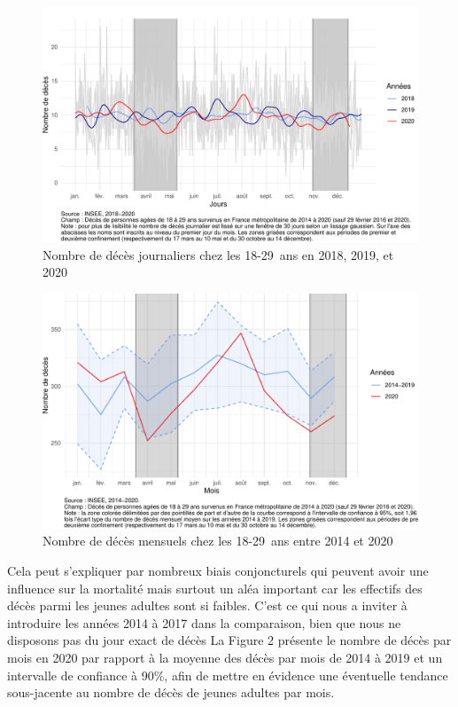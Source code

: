 \documentclass[titlepage]{article}
\begin{document}
\begin{figure}
\begin{center}
\includegraphics{Aussant_Forcadell_Sessego-courbe_2018_2019}
\end{center}
\caption{Nombre de décès journaliers chez les 18-29 ans en 2018, 2019, et 2020}
\label{fig:courbe_2018_2019}
\end{figure}


\begin{figure}
\begin{center}
\includegraphics{Aussant_Forcadell_Sessego-courbe_2014_2020}
\end{center}
\caption{Nombre de décès mensuels chez les 18-29 ans entre 2014 et 2020}
\label{fig:courbe_2014_2020}
\end{figure}


Cela peut s'expliquer par nombreux biais conjoncturels qui peuvent avoir une influence sur la mortalité mais surtout un aléa important car les effectifs des décès parmi les jeunes adultes sont si faibles. C'est ce qui nous a inviter à introduire les années 2014 à 2017 dans la comparaison, bien que nous ne disposons pas du jour exact de décès La Figure 2 présente le nombre de décès par mois en 2020 par rapport à la moyenne des décès par mois de 2014 à 2019 et un intervalle de confiance à 90\%, afin de mettre en évidence une éventuelle tendance sous-jacente au nombre de décès de jeunes adultes par mois. \\
\end{document}
